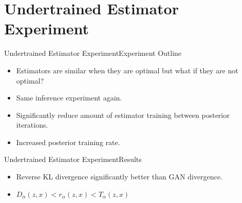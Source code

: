 \documentclass[handout]{beamer}
\begin{document}
\section{Undertrained Estimator Experiment}
\begin{frame}{Undertrained Estimator Experiment}{Experiment Outline}
\begin{itemize}
\item Estimators are similar when they are optimal but what if they are not optimal?
\vspace{0.5cm}
\item Same inference experiment again.
\vspace{0.5cm}
\item Significantly reduce amount of estimator training between posterior iterations.
\vspace{0.5cm}
\item Increased posterior training rate.
\end{itemize}
\end{frame}
\begin{frame}{Undertrained Estimator Experiment}{Results}
\begin{table}[h]
\end{table}
\begin{itemize}
\item Reverse KL divergence significantly better than GAN divergence.
\vspace{0.5cm}
\item $D_\alpha(z,x)<r_\alpha(z,x)<T_\alpha(z,x)$
\end{itemize}
\end{frame}
\end{document}
